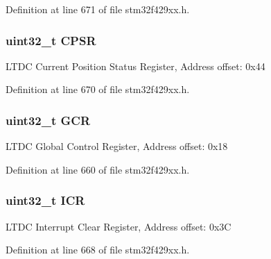 Definition at line 671 of file stm32f429xx.\+h.

\subsubsection[{\texorpdfstring{C\+P\+SR}{CPSR}}]{ uint32\+\_\+t C\+P\+SR}\hypertarget{struct_l_t_d_c___type_def_a140588a82bafbf0bf0c983111aadb351}{}\label{struct_l_t_d_c___type_def_a140588a82bafbf0bf0c983111aadb351}
L\+T\+DC Current Position Status Register, Address offset\+: 0x44 

Definition at line 670 of file stm32f429xx.\+h.

\subsubsection[{\texorpdfstring{G\+CR}{GCR}}]{ uint32\+\_\+t G\+CR}\hypertarget{struct_l_t_d_c___type_def_aae092d9d07574afe1fbc79c8bf7f7c19}{}\label{struct_l_t_d_c___type_def_aae092d9d07574afe1fbc79c8bf7f7c19}
L\+T\+DC Global Control Register, Address offset\+: 0x18 

Definition at line 660 of file stm32f429xx.\+h.

\subsubsection[{\texorpdfstring{I\+CR}{ICR}}]{ uint32\+\_\+t I\+CR}\hypertarget{struct_l_t_d_c___type_def_a0a8c8230846fd8ff154b9fde8dfa0399}{}\label{struct_l_t_d_c___type_def_a0a8c8230846fd8ff154b9fde8dfa0399}
L\+T\+DC Interrupt Clear Register, Address offset\+: 0x3C 

Definition at line 668 of file stm32f429xx.\+h.

